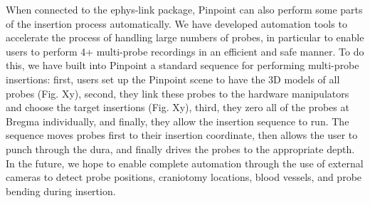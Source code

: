 When connected to the ephys-link package, Pinpoint can also perform some parts of the insertion process automatically. We have developed automation tools to accelerate the process of handling large numbers of probes, in particular to enable users to perform 4+ multi-probe recordings in an efficient and safe manner. To do this, we have built into Pinpoint a standard sequence for performing multi-probe insertions: first, users set up the Pinpoint scene to have the 3D models of all probes (Fig. Xy), second, they link these probes to the hardware manipulators and choose the target insertions (Fig. Xy), third, they zero all of the probes at Bregma individually, and finally, they allow the insertion sequence to run. The sequence moves probes first to their insertion coordinate, then allows the user to punch through the dura, and finally drives the probes to the appropriate depth. In the future, we hope to enable complete automation through the use of external cameras to detect probe positions, craniotomy locations, blood vessels, and probe bending during insertion. 